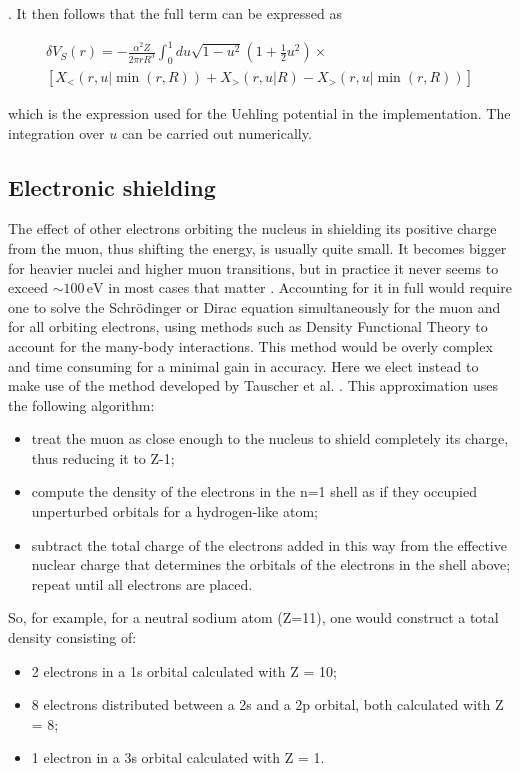 \documentclass[]{report}
\begin{document}
. It then follows that the full term can be expressed as

\begin{multline}
\delta V_S(r) =  -\frac{\alpha^2Z}{2\pi rR^3}\int_0^1 du \sqrt{1-u^2}\left(1+\frac{1}{2}u^2\right) \times \\
\left[X_{<}(r, u | \min(r, R)) + X_{>}(r, u | R) -X_{>}(r, u | \min(r, R))\right]
\end{multline}

which is the expression used for the Uehling potential in the implementation. The integration over $u$ can be carried out numerically.

\subsection{Electronic shielding}

The effect of other electrons orbiting the nucleus in shielding its positive charge from the muon, thus shifting the energy, is usually quite small. It becomes bigger for heavier nuclei and higher muon transitions, but in practice it never seems to exceed $\sim100 \,\mathrm{eV}$ in most cases that matter \cite{borie1982}. Accounting for it in full would require one to solve the Schr\"{o}dinger or Dirac equation simultaneously for the muon and for all orbiting electrons, using methods such as Density Functional Theory to account for the many-body interactions. This method would be overly complex and time consuming for a minimal gain in accuracy. Here we elect instead to make use of the method developed by Tauscher et al. \cite{tauscher1978}. This approximation uses the following algorithm:

\begin{itemize}
	\item treat the muon as close enough to the nucleus to shield completely its charge, thus reducing it to Z-1;
	\item compute the density of the electrons in the n=1 shell as if they occupied unperturbed orbitals for a hydrogen-like atom;
	\item subtract the total charge of the electrons added in this way from the effective nuclear charge that determines the orbitals of the electrons in the shell above; repeat until all electrons are placed.
\end{itemize}

So, for example, for a neutral sodium atom (Z=11), one would construct a total density consisting of:

\begin{itemize}
	\item 2 electrons in a 1s orbital calculated with Z = 10;
	\item 8 electrons distributed between a 2s and a 2p orbital, both calculated with Z = 8;
	\item 1 electron in a 3s orbital calculated with Z = 1.
\end{itemize}
\end{document}
